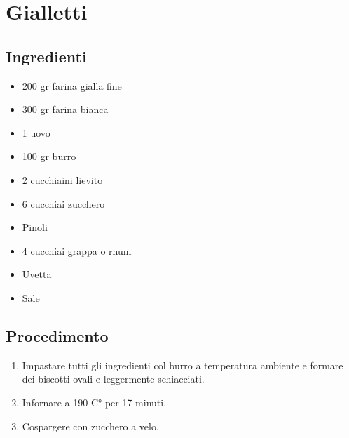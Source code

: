 \section{Gialletti}
\subsection{Ingredienti}
\begin{itemize}
\item 200 gr farina gialla fine  
\item 300 gr farina bianca  
\item 1 uovo  
\item 100 gr burro  
\item 2 cucchiaini lievito  
\item 6 cucchiai zucchero  
\item Pinoli  
\item 4 cucchiai grappa o rhum  
\item Uvetta  
\item Sale
\end{itemize}
\subsection{Procedimento}
\begin{enumerate}
\item  Impastare tutti gli ingredienti col burro a temperatura ambiente e formare dei biscotti ovali e leggermente schiacciati.   
\item  Infornare a 190 C° per 17 minuti.  
\item  Cospargere con zucchero a velo.
\end{enumerate}
